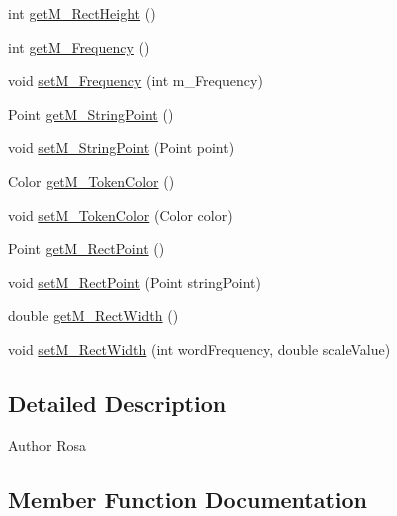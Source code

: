 \begin{DoxyCompactItemize}
\item 
int \hyperlink{classtranslation_visualization_1_1_item_a7a26fdee9c032f10c9bf94c4d735d7eb}{get\+M\+\_\+\+Rect\+Height} ()
\item 
int \hyperlink{classtranslation_visualization_1_1_item_a22ac1422e791c719345f2000be70617a}{get\+M\+\_\+\+Frequency} ()
\item 
void \hyperlink{classtranslation_visualization_1_1_item_af88f3e8624be508ee442162a07273fcf}{set\+M\+\_\+\+Frequency} (int m\+\_\+\+Frequency)
\item 
Point \hyperlink{classtranslation_visualization_1_1_item_ad8abc2cbd3913f01d8de6ae85309c58b}{get\+M\+\_\+\+String\+Point} ()
\item 
void \hyperlink{classtranslation_visualization_1_1_item_a87bdfdce59224975082ab87d6ff0c38c}{set\+M\+\_\+\+String\+Point} (Point point)
\item 
Color \hyperlink{classtranslation_visualization_1_1_item_af7020b60237f7491abf8b0d68612ef3e}{get\+M\+\_\+\+Token\+Color} ()
\item 
void \hyperlink{classtranslation_visualization_1_1_item_a3fcd8e191d44eb3fc2762172b1075514}{set\+M\+\_\+\+Token\+Color} (Color color)
\item 
Point \hyperlink{classtranslation_visualization_1_1_item_a0e7c98edb9fc0371e4de760961d26590}{get\+M\+\_\+\+Rect\+Point} ()
\item 
void \hyperlink{classtranslation_visualization_1_1_item_a7f3800ca0e6278cfb693b559c96eaedf}{set\+M\+\_\+\+Rect\+Point} (Point string\+Point)
\item 
double \hyperlink{classtranslation_visualization_1_1_item_a9486306afc75a5d256fcb515b6d5630b}{get\+M\+\_\+\+Rect\+Width} ()
\item 
void \hyperlink{classtranslation_visualization_1_1_item_a4fee3de03fa3b1e219cd5c4c8d0ebc95}{set\+M\+\_\+\+Rect\+Width} (int word\+Frequency, double scale\+Value)
\end{DoxyCompactItemize}


\subsection{Detailed Description}
\begin{DoxyAuthor}{Author}
Rosa 
\end{DoxyAuthor}


\subsection{Member Function Documentation}
\mbox{\label{classtranslation_visualization_1_1_item_a22ac1422e791c719345f2000be70617a}} 
